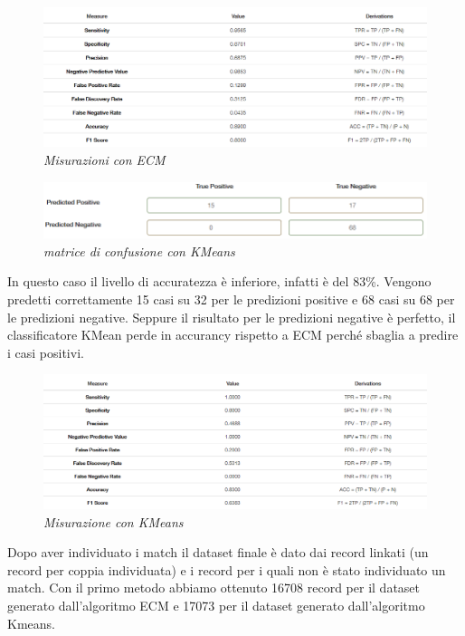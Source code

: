 \documentclass[a4paper,12pt]{article}
\begin{document}
\begin{figure}[H]
	\centering
	\includegraphics[width=1\linewidth]{img/analysis_ecm.png}
	\caption{\textit{Misurazioni con ECM}}
\end{figure}


\begin{figure}[H]
	\centering
	\includegraphics[width=0.8\linewidth]{img/confusion_kmeans.png}
	\caption{\textit{matrice di confusione con KMeans}}
\end{figure}

\noindent In questo caso il livello di accuratezza è inferiore, infatti è del 83\%. Vengono predetti correttamente 15 casi su 32 per le predizioni positive e 68 casi su 68 per le predizioni negative. Seppure il risultato per le predizioni negative è perfetto, il classificatore KMean perde in accurancy rispetto a ECM perché sbaglia a predire i casi positivi. 

\begin{figure}[H]
	\centering
	\includegraphics[width=1\linewidth]{img/analysis_kmeans.png}
	\caption{\textit{Misurazione con KMeans}}
\end{figure}

\noindent Dopo aver individuato i match il dataset finale è dato dai record linkati (un record per coppia individuata) e i record per i quali non è stato individuato un match.
Con il primo metodo abbiamo ottenuto 16708 record per il dataset generato dall'algoritmo ECM e 17073 per il dataset generato dall'algoritmo Kmeans. 
\newpage
\end{document}
